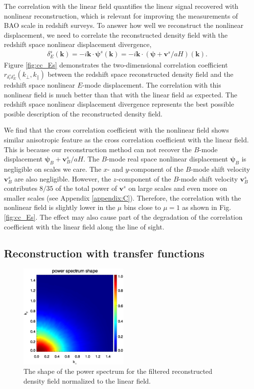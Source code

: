\documentclass[aps,prx,twocolumn,superscriptaddress,groupedaddress,nofootinbib,amsfont]{revtex4}  %
\newcommand{\bea}{\begin{eqnarray}}
\newcommand{\eea}{\end{eqnarray}}
\newcommand{\bmp}{\bm{\psi}}
\newcommand{\bmv}{\bm{v}}
\newcommand{\bmk}{\bm{k}}
\begin{document}
The correlation with the linear field quantifies the linear signal recovered
with nonlinear reconstruction, which is relevant for improving the measurements
of BAO scale in redshift surveys. 
To answer how well we reconstruct the nonlinear displacement, we need to
correlate the reconstructed density field with the redshift space nonlinear 
displacement divergence,
\bea
\delta_E^s(\bmk)=-i\bmk\cdot\bmp^s(\bmk)=-i\bmk\cdot(\bmp+\bmv^s/aH)(\bmk).
\eea
Figure \ref{fig:cc_Es} demonstrates the two-dimensional correlation coefficient 
$r_{\delta_r^s\delta_E^s}(k_\perp,k_\parallel)$ between the redshift space reconstructed density field and the redshift space nonlinear $E$-mode displacement.
The correlation with this nonlinear field is much better than that with the 
linear field as expected.
The redshift space nonlinear displacement divergence represents the best 
possible posible description of the reconstructed density field.

We find that the cross correlation coefficient with the nonlinear field shows 
similar anisotropic feature as the cross correlation coefficient with the 
linear field. This is because our reconstruction method can not recover the 
$B$-mode displacement $\bmp_B+\bmv_B^s/aH$. The $B$-mode real space nonlinear 
displacement $\bmp_B$ is negligible on scales we care. The $x$- and $y$-component of the $B$-mode shift velocity $\bmv^s_B$ are also negligible.
However, the $z$-component of the $B$-mode shift velocity $\bmv^s_B$ contributes
$8/35$ of the total power of $\bmv^s$ on large scales and even more on smaller
scales (see Appendix \ref{appendix:C}). 
Therefore, the correlation with the nonlinear field is slightly lower in the 
$\mu$ bins close to $\mu=1$ as shown in Fig. \ref{fig:cc_Es}.
The effect may also cause part of the degradation of the correlation coefficient
with the linear field along the line of sight.


\subsection{Reconstruction with transfer functions}

\begin{figure}[tbp]
\begin{center}
\includegraphics[width=0.48\textwidth]{0.000anishape_deltaRs-tfxLs_4x.eps}
\end{center}
\vspace{-0.7cm}
\caption{The shape of the power spectrum for the filtered reconstructed density 
    field normalized to the linear field.}
\label{fig:shape_Ls}
\end{figure}
\end{document}
